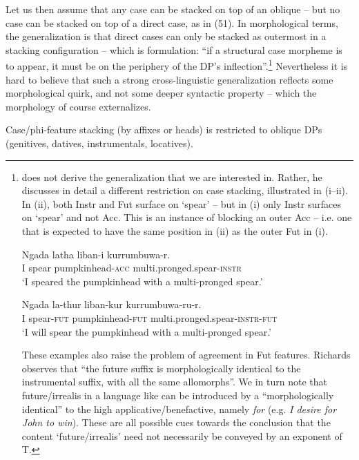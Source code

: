 \documentclass[output=paper]{langsci/langscibook}
\begin{document}
Let us then assume that any case can be stacked on top of an oblique – but no case can be stacked on top of a direct case, as in (51). In morphological terms, the generalization is that direct cases can only be stacked as outermost in a stacking configuration – which is  formulation: “if a structural case morpheme is to appear, it must be on the periphery of the DP’s inflection”.\footnote{\citet{Richards2013} does not derive the generalization that we are interested in. Rather, he discusses in detail a different restriction on case stacking, illustrated in (i--ii). In (ii), both Instr and Fut surface on ‘spear’ – but in (i) only Instr surfaces on ‘spear’ and not Acc. This is an instance of blocking an outer Acc – i.e. one that is expected to have the same position in (ii) as the outer Fut in (i).

\ea \gll    Ngada latha   liban-i       kurrumbuwa-r.\\
            I   spear   pumpkinhead-\textsc{acc}   multi.pronged.spear-\textsc{instr}\\
    \glt    ‘I speared the pumpkinhead with a multi-pronged spear.’\\
\z

\ea \gll    Ngada     la-thur     liban-kur     kurrumbuwa-ru-r.\\
            I     spear-\textsc{fut}   pumpkinhead-\textsc{fut}   multi.pronged.spear-\textsc{instr-fut}\\
    \glt    ‘I will spear the pumpkinhead with a multi-pronged spear.’\\
\z

These examples also raise the problem of agreement in Fut features. Richards observes that “the future suffix is morphologically identical to the instrumental suffix, with all the same allomorphs”. We in turn note that future\slash irrealis in a language like  can be introduced by a  “morphologically identical” to the high applicative\slash benefactive, namely \textit{for} (e.g. \textit{I desire for John to win}). These are all possible cues towards the conclusion that the content ‘future\slash irrealis’ need not necessarily be conveyed by an exponent of T.}  Nevertheless it is hard to believe that such a strong cross-linguistic generalization reflects some morphological quirk, and not some deeper syntactic property – which the morphology of course externalizes. 

\ea%
    \label{ex:manzini:51}
    Case/phi-feature stacking (by affixes or  heads) is restricted to oblique DPs (genitives, datives, instrumentals, locatives).  
    \z         
\end{document}
